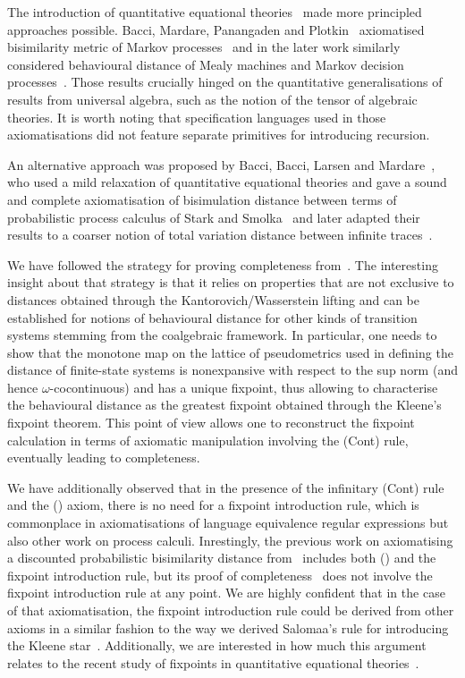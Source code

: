 The introduction of quantitative equational theories~\cite{Mardare:2016:Quantitative} made more principled approaches possible. Bacci, Mardare, Panangaden and Plotkin~\cite{Bacci:2018:Algebraic} axiomatised bisimilarity metric of Markov processes~\cite{Desharnais:2004:Metrics} and in the later work similarly considered behavioural distance of Mealy machines and Markov decision processes~\cite{Bacci:2024:Sum}. Those results crucially hinged on the quantitative generalisations of results from universal algebra, such as the notion of the tensor of algebraic theories. It is worth noting that specification languages used in those axiomatisations did not feature separate primitives for introducing recursion.

An alternative approach was proposed by Bacci, Bacci, Larsen and Mardare~\cite{Bacci:2018:Bisimilarity}, who used a mild relaxation of quantitative equational theories and gave a sound and complete axiomatisation of bisimulation distance between terms of probabilistic process calculus of Stark and Smolka~\cite{Stark:2000:Complete} and later adapted their results to a coarser notion of total variation distance between infinite traces~\cite{Bacci:2018:TV}. 

We have followed the strategy for proving completeness from~\cite{Bacci:2018:Bisimilarity}. The interesting insight about that strategy is that it relies on properties that are not exclusive to distances obtained through the Kantorovich/Wasserstein lifting and can be established for notions of behavioural distance for other kinds of transition systems stemming from the coalgebraic framework. In particular, one needs to show that the monotone map on the lattice of pseudometrics used in defining the distance of finite-state systems is nonexpansive with respect to the sup norm (and hence $\omega$-cocontinuous) and has a unique fixpoint, thus allowing to characterise the behavioural distance as the greatest fixpoint obtained through the Kleene's fixpoint theorem. This point of view allows one to reconstruct the fixpoint calculation in terms of axiomatic manipulation involving the \textsf{(Cont)} rule, eventually leading to completeness.

We have additionally observed that in the presence of the infinitary \textsf{(Cont)} rule and the \textsf{(\dPref)} axiom, there is no need for a fixpoint introduction rule, which is commonplace in axiomatisations of language equivalence regular expressions but also other work on process calculi. Inrestingly, the previous work on axiomatising a discounted probabilistic bisimilarity distance from~\cite{Bacci:2018:Bisimilarity} includes both \textsf{(\dPref)} and the fixpoint introduction rule, but its proof of completeness~\cite[Theorem~6.4]{Bacci:2018:Bisimilarity} does not involve the fixpoint introduction rule at any point. We are highly confident that in the case of that axiomatisation, the fixpoint introduction rule could be derived from other axioms in a similar fashion to the way we derived Salomaa's rule for introducing the Kleene star~\cite{Salomaa:1966:Two}. Additionally, we are interested in how much this argument relates to the recent study of fixpoints in quantitative equational theories~\cite{Mardare:2021:Fixed}. 

